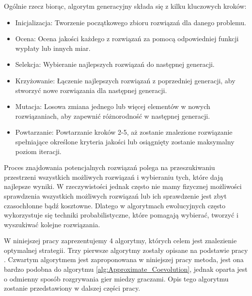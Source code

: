 \documentclass[inzynierska]{pwr_wmat_praca_dyplomowa}
\theoremstyle{plain}
\numberwithin{theorem}{chapter}
\theoremstyle{definition}
\numberwithin{theorem}{chapter}
\begin{document}
	Ogólnie rzecz biorąc, algorytm generacyjny składa się z kilku kluczowych kroków:
	\begin{itemize}
		\item Inicjalizacja: Tworzenie początkowego zbioru rozwiązań dla danego problemu.
		\item Ocena: Ocena jakości każdego z rozwiązań za pomocą odpowiedniej funkcji wypłaty lub innych miar.
		\item Selekcja: Wybieranie najlepszych rozwiązań do następnej generacji.
		\item Krzyżowanie: Łączenie najlepszych rozwiązań z poprzedniej generacji, aby stworzyć nowe rozwiązania dla następnej generacji.
		\item Mutacja: Losowa zmiana jednego lub więcej elementów w nowych rozwiązaniach, aby zapewnić różnorodność w następnej generacji.
		\item Powtarzanie: Powtarzanie kroków 2-5, aż zostanie znalezione rozwiązanie spełniające określone kryteria jakości lub osiągnięty zostanie maksymalny poziom iteracji.
	\end{itemize}	
	Proces znajdowania potencjalnych rozwiązań polega na przeszukiwaniu przestrzeni wszystkich możliwych rozwiązań i wybieraniu tych, które dają najlepsze wyniki. W rzeczywistości jednak często nie mamy fizycznej możliwości sprawdzenia wszystkich możliwych rozwiązań lub ich sprawdzenie jest zbyt czasochłonne bądź kosztowne. Dlatego w algorytmach ewolucyjnych często wykorzystuje się techniki probabilistyczne, które pomagają wybierać, tworzyć i wyszukiwać kolejne rozwiązania.
	
	W niniejszej pracy zaprezentujemy 4 algorytmy, których celem jest znalezienie optymalnej strategii. Trzy pierwsze algorytmy zostały opisane na podstawie pracy \cite{cauwet2018surprising}. Czwartym algorytmem jest zaproponowana w niniejszej pracy metoda, jest ona bardzo podobna do algorytmu \ref{alg:Approximate_Coevolution}, jednak oparta jest o odmienny sposób rozgrywania gier miedzy graczami. Opis tego algorytmu zostanie przedstawiony w dalszej części pracy.
\end{document}
